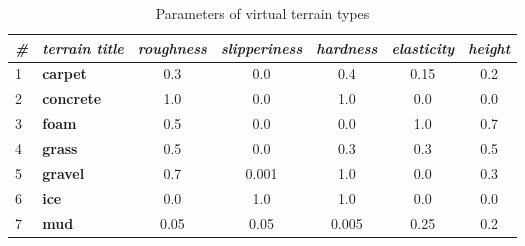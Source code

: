\begin{table}[H]
\centering
\caption{Parameters of virtual terrain types}
\label{tab:terrains_parameters}
\begin{tabular}{|l|l|c|c|c|c|c|}
\hline
\textit{\#}                                       & \textit{terrain title} & \multicolumn{1}{l|}{\textit{roughness}} & \multicolumn{1}{l|}{\textit{slipperiness}} & \multicolumn{1}{l|}{\textit{hardness}} & \multicolumn{1}{l|}{\textit{elasticity}} & \multicolumn{1}{l|}{\textit{height}} \\ \hline
1                         & \textbf{carpet}        & 0.3                                     & 0.0                                        & 0.4                                    & 0.15                                     & 0.2                                  \\ \hline
2                         & \textbf{concrete}      & 1.0                                     & 0.0                                        & 1.0                                    & 0.0                                      & 0.0                                  \\ \hline
3                         & \textbf{foam}          & 0.5                                     & 0.0                                        & 0.0                                    & 1.0                                      & 0.7                                  \\ \hline
4                         & \textbf{grass}         & 0.5                                     & 0.0                                        & 0.3                                    & 0.3                                      & 0.5                                  \\ \hline
5                         & \textbf{gravel}        & 0.7                                     & 0.001                                      & 1.0                                    & 0.0                                      & 0.3                                  \\ \hline
6                         & \textbf{ice}           & 0.0                                     & 1.0                                        & 1.0                                    & 0.0                                      & 0.0                                  \\ \hline
7                         & \textbf{mud}           & 0.05                                    & 0.05                                       & 0.005                                  & 0.25                                     & 0.2                                  \\ \hline

\end{tabular}
\end{table}
